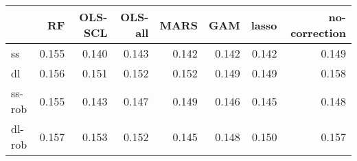 \begin{tabular}{lrrrrrrr}
\toprule
 & RF & OLS-SCL & OLS-all & MARS & GAM & lasso & no-correction \\
\midrule
ss & {\cellcolor[HTML]{000000}} \color[HTML]{F1F1F1} 0.155 & {\cellcolor[HTML]{F1F1F1}} \color[HTML]{000000} 0.140 & {\cellcolor[HTML]{CACACA}} \color[HTML]{000000} 0.143 & {\cellcolor[HTML]{DDDDDD}} \color[HTML]{000000} 0.142 & {\cellcolor[HTML]{D4D4D4}} \color[HTML]{000000} 0.142 & {\cellcolor[HTML]{DDDDDD}} \color[HTML]{000000} 0.142 & {\cellcolor[HTML]{6A6A6A}} \color[HTML]{F1F1F1} 0.149 \\
dl & {\cellcolor[HTML]{222222}} \color[HTML]{F1F1F1} 0.156 & {\cellcolor[HTML]{ADADAD}} \color[HTML]{000000} 0.151 & {\cellcolor[HTML]{A7A7A7}} \color[HTML]{F1F1F1} 0.152 & {\cellcolor[HTML]{A7A7A7}} \color[HTML]{F1F1F1} 0.152 & {\cellcolor[HTML]{F1F1F1}} \color[HTML]{000000} 0.149 & {\cellcolor[HTML]{EDEDED}} \color[HTML]{000000} 0.149 & {\cellcolor[HTML]{000000}} \color[HTML]{F1F1F1} 0.158 \\
ss-rob & {\cellcolor[HTML]{000000}} \color[HTML]{F1F1F1} 0.155 & {\cellcolor[HTML]{F1F1F1}} \color[HTML]{000000} 0.143 & {\cellcolor[HTML]{A2A2A2}} \color[HTML]{F1F1F1} 0.147 & {\cellcolor[HTML]{878787}} \color[HTML]{F1F1F1} 0.149 & {\cellcolor[HTML]{C3C3C3}} \color[HTML]{000000} 0.146 & {\cellcolor[HTML]{C5C5C5}} \color[HTML]{000000} 0.145 & {\cellcolor[HTML]{8F8F8F}} \color[HTML]{F1F1F1} 0.148 \\
dl-rob & {\cellcolor[HTML]{000000}} \color[HTML]{F1F1F1} 0.157 & {\cellcolor[HTML]{4E4E4E}} \color[HTML]{F1F1F1} 0.153 & {\cellcolor[HTML]{696969}} \color[HTML]{F1F1F1} 0.152 & {\cellcolor[HTML]{F1F1F1}} \color[HTML]{000000} 0.145 & {\cellcolor[HTML]{A8A8A8}} \color[HTML]{F1F1F1} 0.148 & {\cellcolor[HTML]{888888}} \color[HTML]{F1F1F1} 0.150 & {\cellcolor[HTML]{060606}} \color[HTML]{F1F1F1} 0.157 \\
\bottomrule
\end{tabular}
